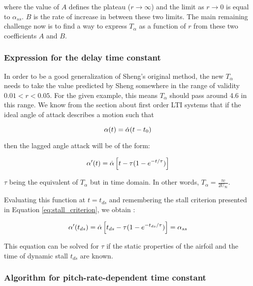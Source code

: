 \noindent where the value of $A$ defines the plateau ($r \rightarrow \infty$) and the limit as $r \rightarrow 0$ is equal to $\alpha_{ss}$. $B$ is the rate of increase in between these two limits. The main remaining challenge now is to find a way to express $T_\alpha$ as a function of $r$ from these two coefficients $A$ and $B$.

\subsubsection{Expression for the delay time constant}

In order to be a good generalization of Sheng's original method, the new $T_\alpha$ needs to take the value predicted by Sheng somewhere in the range of validity $0.01<r<0.05$. For the given example, this means $T_\alpha$ should pass around  4.6 in this range.
We know from the section about first order LTI systems that if the ideal angle of attack describes a motion such that 

 
\begin{equation}
\alpha(t) = \dot{\alpha}(t-t_0)
\end{equation}

\noindent then the lagged angle attack will be of the form:

\begin{equation}
\alpha'(t) = \dot{\alpha}\left[t- \tau(1-e^{-t/ \tau})\right]
\end{equation}

\noindent $\tau$ being the equivalent of $T_\alpha$ but in time domain. In other words, $T_\alpha = \frac{\tau c}{2U_\infty}$.

Evaluating this function at $t=t_{ds}$ and remembering the stall criterion presented in Equation \eqref{eq:stall_criterion}, we obtain : 

\begin{equation}
\alpha'(t_{ds}) = \dot{\alpha}\left[t_{ds} - \tau(1-e^{-t_{ds} / \tau})\right] = \alpha_{ss}
\label{eq:alpha_ds_tau}
\end{equation}

This equation can be solved for $\tau$ if the static properties of the airfoil and the time of dynamic stall $t_{ds}$ are known.

\subsubsection{Algorithm for pitch-rate-dependent time constant}

